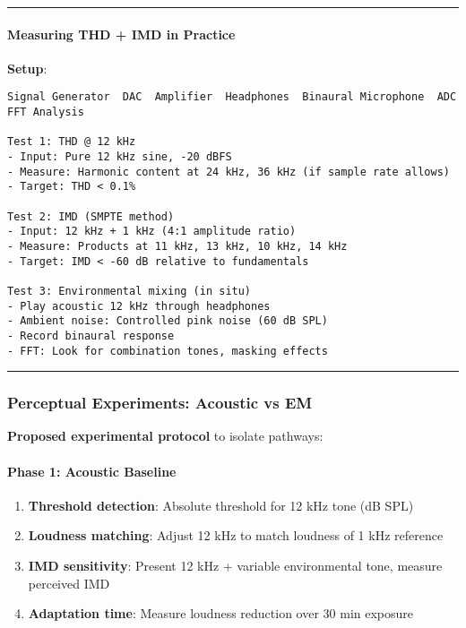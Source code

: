 \begin{center}\rule{0.5\linewidth}{0.5pt}\end{center}

\paragraph{Measuring THD + IMD in
Practice}\label{measuring-thd-imd-in-practice}

\textbf{Setup}:

\begin{verbatim}
Signal Generator  DAC  Amplifier  Headphones  Binaural Microphone  ADC  FFT Analysis

Test 1: THD @ 12 kHz
- Input: Pure 12 kHz sine, -20 dBFS
- Measure: Harmonic content at 24 kHz, 36 kHz (if sample rate allows)
- Target: THD < 0.1%

Test 2: IMD (SMPTE method)
- Input: 12 kHz + 1 kHz (4:1 amplitude ratio)
- Measure: Products at 11 kHz, 13 kHz, 10 kHz, 14 kHz
- Target: IMD < -60 dB relative to fundamentals

Test 3: Environmental mixing (in situ)
- Play acoustic 12 kHz through headphones
- Ambient noise: Controlled pink noise (60 dB SPL)
- Record binaural response
- FFT: Look for combination tones, masking effects
\end{verbatim}

\begin{center}\rule{0.5\linewidth}{0.5pt}\end{center}

\subsubsection{Perceptual Experiments: Acoustic vs
EM}\label{perceptual-experiments-acoustic-vs-em}

\textbf{Proposed experimental protocol} to isolate pathways:

\paragraph{Phase 1: Acoustic Baseline}\label{phase-1-acoustic-baseline}

\begin{enumerate}
\def\labelenumi{\arabic{enumi}.}
\tightlist
\item
  \textbf{Threshold detection}: Absolute threshold for 12 kHz tone (dB
  SPL)
\item
  \textbf{Loudness matching}: Adjust 12 kHz to match loudness of 1 kHz
  reference
\item
  \textbf{IMD sensitivity}: Present 12 kHz + variable environmental
  tone, measure perceived IMD
\item
  \textbf{Adaptation time}: Measure loudness reduction over 30 min
  exposure
\end{enumerate}

